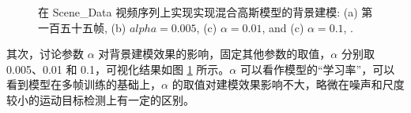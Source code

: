 \begin{figure}[!ht]
  \centering
  \begin{minipage}[b]{\linewidth} 

  \end{minipage}
  \vfill
  \caption{在 Scene\_Data 视频序列上实现实现混合高斯模型的背景建模: (a) 第一百五十五帧, (b) $alpha=0.005$, (c) $\alpha = 0.01$, and (c) $\alpha = 0.1$, .}
  \label{fig:alpha}
\end{figure}

其次，讨论参数 $\alpha$ 对背景建模效果的影响，固定其他参数的取值，$\alpha$ 分别取 0.005、0.01 和 0.1，可视化结果如图 \ref{fig:alpha} 所示。$\alpha$ 可以看作模型的“学习率”，可以看到模型在多帧训练的基础上，$\alpha$ 的取值对建模效果影响不大，略微在噪声和尺度较小的运动目标检测上有一定的区别。


